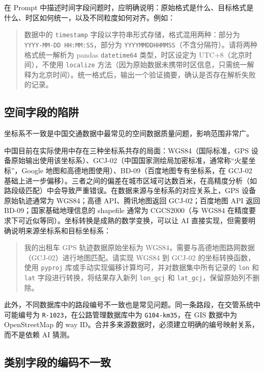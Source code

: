 在 Prompt 中描述时间字段问题时，应明确说明：原始格式是什么、目标格式是什么、时区如何统一，以及不同粒度如何对齐。例如：

\begin{quote}
数据中的 \texttt{timestamp} 字段以字符串形式存储，格式混用两种：部分为 \texttt{YYYY-MM-DD HH:MM:SS}，部分为 \texttt{YYYYMMDDHHMMSS}（不含分隔符）。请将两种格式统一解析为 pandas \texttt{datetime64} 类型，时区设定为 UTC+8（北京时间），不使用 \texttt{localize} 方法（因为原始数据未携带时区信息，只需统一解释为北京时间）。统一格式后，输出一个验证摘要，确认是否存在解析失败的记录。
\end{quote}

\subsection{空间字段的陷阱}

坐标系不一致是中国交通数据中最常见的空间数据质量问题，影响范围非常广。

中国目前在实际使用中存在三种坐标系共存的局面：WGS84（国际标准，GPS 设备原始输出使用该坐标系）、GCJ-02（中国国家测绘局加密标准，通常称“火星坐标”，Google 地图和高德地图使用）、BD-09（百度地图专有坐标系，在 GCJ-02 基础上进一步偏移）。三者之间的偏差在城市区域可达数百米，在高精度分析（如路段级匹配）中会导致严重错误。在数据来源与坐标系的对应关系上，GPS 设备原始轨迹通常为 WGS84；高德 API、腾讯地图返回 GCJ-02；百度地图 API 返回 BD-09；国家基础地理信息的 shapefile 通常为 CGCS2000（与 WGS84 在精度要求下可近似等同）。坐标转换是成熟的数学变换，可以让 AI 直接实现，但需要明确说明来源坐标系和目标坐标系：

\begin{quote}
我的出租车 GPS 轨迹数据原始坐标为 WGS84，需要与高德地图路网数据（GCJ-02）进行地图匹配。请实现 WGS84 到 GCJ-02 的坐标转换函数，使用 \texttt{pyproj} 库或手动实现偏移计算均可，并对数据集中所有记录的 \texttt{lon} 和 \texttt{lat} 字段进行转换，将结果存入新列 \texttt{lon\_gcj} 和 \texttt{lat\_gcj}，保留原始列不删除。
\end{quote}

此外，不同数据库中的路段编号不一致也是常见问题。同一条路段，在交管系统中可能编号为 \texttt{R-1023}，在公路管理数据库中为 \texttt{G104-km35}，在 GIS 数据中为 OpenStreetMap 的 way ID。合并多来源数据时，必须建立明确的编号映射关系，而不是依赖 AI 猜测。

\subsection{类别字段的编码不一致}

